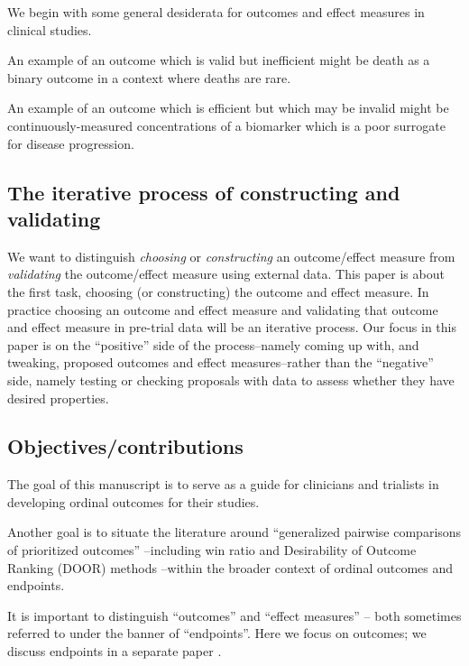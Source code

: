 \documentclass[
  11pt,
  fleqn
]{article}
\begin{document}
We begin with some general desiderata for outcomes and effect measures in
clinical studies.

An example of an outcome which is valid but inefficient might be
death as a binary outcome in a context where deaths
are rare.

An example of an outcome which is efficient but which may be invalid
might be continuously-measured concentrations of a biomarker which is a poor
surrogate for disease progression.

\subsection{The iterative process of constructing and validating}

We want to distinguish \emph{choosing} or \emph{constructing} an
outcome/effect
measure from \emph{validating} the outcome/effect measure using
external data.
This paper is about the first task, choosing (or constructing)
the outcome and
effect measure. In practice choosing an outcome and effect measure and
validating that outcome and effect measure in pre-trial data will be an
iterative process. Our focus in this paper is on the ``positive''
side of the
process--namely coming up with, and tweaking, proposed outcomes and effect
measures--rather than the ``negative'' side, namely testing or checking
proposals with data to assess whether they have desired properties.

\subsection{Objectives/contributions}

The goal of this manuscript is to serve as a guide for clinicians
and trialists
in developing ordinal outcomes for their studies.

Another goal is to situate the literature around ``generalized
pairwise comparisons of prioritized outcomes''
\citep{buyseGeneralizedPairwiseComparisons2022}--including win ratio
\citep{pocockWinRatioNew2012} and Desirability of Outcome Ranking (DOOR)
methods \citep{evansDesirabilityOutcomeRanking2015,
ongUnlockingDOORHow2023}--within the broader context of ordinal outcomes and
endpoints.

It is important to distinguish ``outcomes'' and ``effect measures'' -- both
sometimes referred to under the banner of ``endpoints''. Here we
focus on outcomes; we discuss endpoints in a separate paper .
\end{document}
